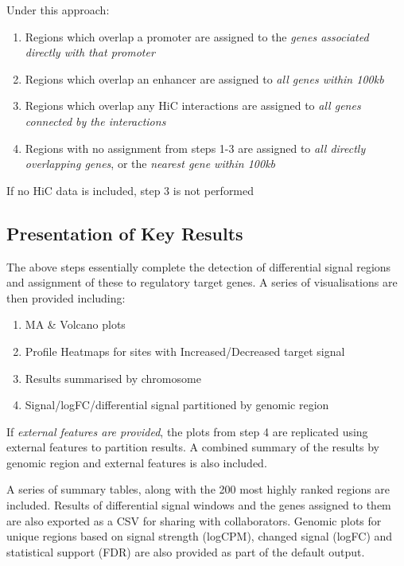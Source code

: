 \documentclass[
]{book}
\providecommand{\tightlist}{%
  \setlength{\itemsep}{0pt}\setlength{\parskip}{0pt}}
\begin{document}
Under this approach:

\begin{enumerate}
\def\labelenumi{\arabic{enumi}.}
\tightlist
\item
  Regions which overlap a promoter are assigned to the \emph{genes associated directly with that promoter}
\item
  Regions which overlap an enhancer are assigned to \emph{all genes within 100kb}
\item
  Regions which overlap any HiC interactions are assigned to \emph{all genes connected by the interactions}
\item
  Regions with no assignment from steps 1-3 are assigned to \emph{all directly overlapping genes}, or the \emph{nearest gene within 100kb}
\end{enumerate}

If no HiC data is included, step 3 is not performed

\hypertarget{presentation-of-key-results}{%
\subsection*{Presentation of Key Results}\label{presentation-of-key-results}}

The above steps essentially complete the detection of differential signal regions and assignment of these to regulatory target genes.
A series of visualisations are then provided including:

\begin{enumerate}
\def\labelenumi{\arabic{enumi}.}
\tightlist
\item
  MA \& Volcano plots
\item
  Profile Heatmaps for sites with Increased/Decreased target signal
\item
  Results summarised by chromosome
\item
  Signal/logFC/differential signal partitioned by genomic region
\end{enumerate}

If \emph{external features are provided}, the plots from step 4 are replicated using external features to partition results.
A combined summary of the results by genomic region and external features is also included.

A series of summary tables, along with the 200 most highly ranked regions are included.
Results of differential signal windows and the genes assigned to them are also exported as a CSV for sharing with collaborators.
Genomic plots for unique regions based on signal strength (logCPM), changed signal (logFC) and statistical support (FDR) are also provided as part of the default output.
\end{document}

